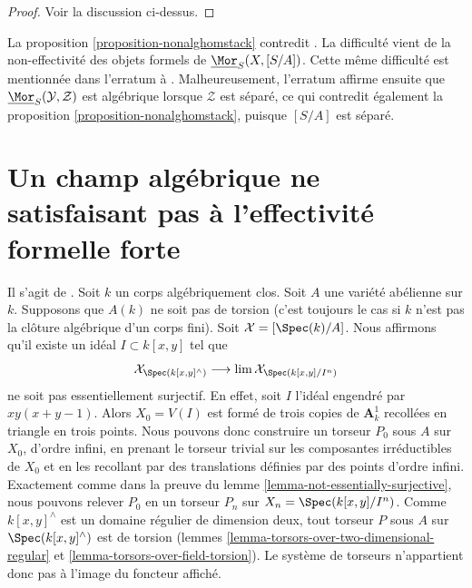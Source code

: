 \begin{proof}
Voir la discussion ci-dessus.
\end{proof}

\begin{remark}
\label{remark-contradict-aoki}
La proposition \ref{proposition-nonalghomstack} contredit
\cite[théorème 1.1]{AokiHomStacks}. La difficulté vient de la non-effectivité
des objets formels de $\underline{\Mor}_S(X, [S/A])$.
Cette même difficulté est mentionnée dans l'erratum
\cite{AokiHomStacksErr} à \cite{AokiHomStacks}. Malheureusement,
l'erratum affirme ensuite que $\underline{\Mor}_S(\mathcal{Y}, \mathcal{Z})$
est algébrique lorsque $\mathcal{Z}$ est séparé, ce qui contredit également
la proposition \ref{proposition-nonalghomstack}, puisque $[S/A]$ est séparé.
\end{remark}








\section[Champ algébrique sans effectivité formelle forte]{Un champ algébrique ne satisfaisant pas à l'effectivité formelle forte}
\label{section-non-formal-effectiveness}

\noindent
Il s'agit de \cite[exemple 4.12]{Bhatt-Algebraize}.
Soit $k$ un corps algébriquement clos.
Soit $A$ une variété abélienne sur $k$.
Supposons que $A(k)$ ne soit pas de torsion (c'est toujours le cas si $k$
n'est pas la clôture algébrique d'un corps fini).
Soit $\mathcal{X} = [\Spec(k)/A]$.
Nous affirmons qu'il existe un idéal $I \subset k[x, y]$
tel que
$$
\mathcal{X}_{\Spec(k[x, y]^\wedge)}
\longrightarrow
\lim \mathcal{X}_{\Spec(k[x, y]/I^n)}
$$
ne soit pas essentiellement surjectif. En effet, soit $I$
l'idéal engendré par $xy(x + y - 1)$.
Alors $X_0 = V(I)$ est formé de trois copies de $\mathbf{A}^1_k$
recollées en triangle en trois points. Nous pouvons donc construire un torseur
$P_0$ sous $A$ sur $X_0$, d'ordre infini, en prenant le torseur trivial
sur les composantes irréductibles de $X_0$ et en les recollant
par des translations définies par des points d'ordre infini.
Exactement comme dans la preuve du lemme \ref{lemma-not-essentially-surjective},
nous pouvons relever $P_0$ en un torseur $P_n$ sur $X_n = \Spec(k[x, y]/I^n)$.
Comme $k[x, y]^\wedge$ est un domaine régulier de dimension deux,
tout torseur $P$ sous $A$ sur $\Spec(k[x, y]^\wedge)$
est de torsion (lemmes \ref{lemma-torsors-over-two-dimensional-regular}
et \ref{lemma-torsors-over-field-torsion}). Le système de
torseurs n'appartient donc pas à l'image du foncteur affiché.

